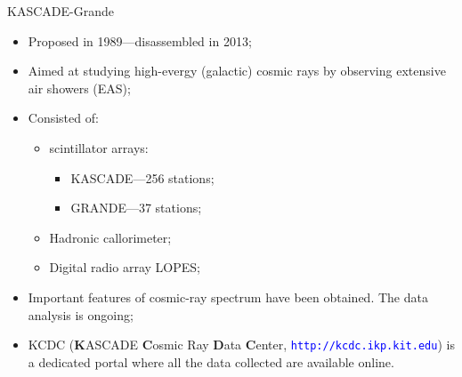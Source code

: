 
\begin{frame}{KASCADE-Grande}
\begin{itemize}
  \item Proposed in 1989---disassembled in 2013;
  \item Aimed at studying
  high-evergy (galactic) cosmic rays by observing extensive air showers (EAS);
  \item Consisted of:
  \begin{itemize}
    \item scintillator arrays:
    \begin{itemize}
    \item KASCADE---256 stations;
    \item GRANDE---37 stations;
    \end{itemize}
    \item Hadronic callorimeter;
    \item Digital radio array LOPES;
  \end{itemize}
  \item Important features of cosmic-ray spectrum have been obtained. The data analysis is ongoing;
  \item KCDC (\textbf{K}ASCADE \textbf{C}osmic Ray \textbf{D}ata \textbf{C}enter, \textcolor{blue}{\texttt{http://kcdc.ikp.kit.edu}}) is a dedicated portal where all the data collected are available online. %
\end{itemize}

\end{frame}

